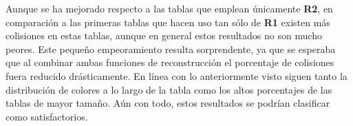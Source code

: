 \documentclass[12pt,spanish,listoffigures,listoftables]{tfgetsinf}
\begin{document}
\def\arraystretch{1.5}
\begin{table}[H]
	\centering
	\caption{Porcentajes de colisiones para las tablas empleando la concatenación de las funciones de reconstrucción}
	\label{colR1R2}
\end{table}

Aunque se ha mejorado respecto a las tablas que emplean únicamente \textbf{R2}, en comparación a las primeras tablas que hacen uso tan sólo de \textbf{R1} existen más colisiones en estas tablas, aunque en general estos resultados no son mucho peores. Este pequeño empeoramiento resulta sorprendente, ya que se esperaba que al combinar ambas funciones de reconstrucción el porcentaje de colisiones fuera reducido drásticamente. En línea con lo anteriormente visto siguen tanto la distribución de colores a lo largo de la tabla como los altos porcentajes de las tablas de mayor tamaño. Aún con todo, estos resultados se podrían clasificar como satisfactorios.
\end{document}
